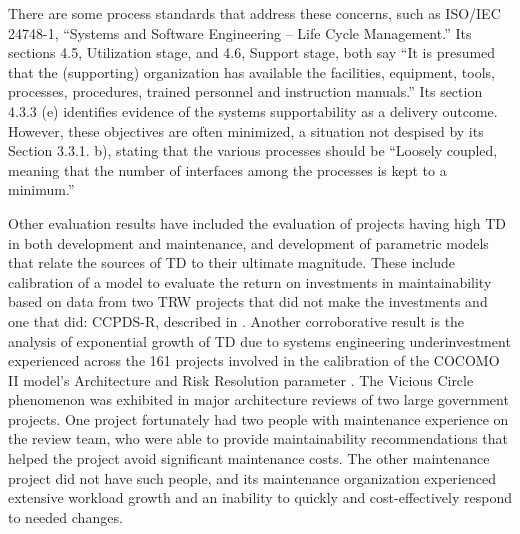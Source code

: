 There are some process standards that address these concerns, such as ISO/IEC 24748-1, “Systems and Software Engineering – Life Cycle Management.” Its sections 4.5, Utilization stage, and 4.6, Support stage, both say “It is presumed that the (supporting) organization has available the facilities, equipment, tools, processes, procedures, trained personnel and instruction manuals.” Its section 4.3.3 (e) identifies evidence of the systems supportability as a delivery outcome. However, these objectives are often minimized, a situation not despised by its Section 3.3.1. b), stating that the various processes should be “Loosely coupled, meaning that the number of interfaces among the processes is kept to a minimum.”
\citep{ISOICETR247481}


Other evaluation results have included the evaluation of projects 
having high TD in both development and maintenance, and development of parametric models that relate the sources of TD to their ultimate magnitude. These include calibration of a model to evaluate the return on investments in maintainability based on data from two TRW projects that did not make the investments and one that did: CCPDS-R, described in \citep{royce1998software}. Another corroborative result is the analysis of exponential growth of TD due to systems engineering underinvestment experienced across the 161 projects involved in the calibration of the COCOMO II model's Architecture and Risk Resolution parameter \citep{boehm2000software}. The Vicious Circle phenomenon was exhibited in major architecture reviews of two large government projects. One project fortunately had two people with maintenance experience on the review team, who were able to provide maintainability recommendations that helped the project avoid significant maintenance costs. The other maintenance project did not have such people, and its maintenance organization experienced extensive workload growth and an inability to quickly and cost-effectively respond to needed changes. 
